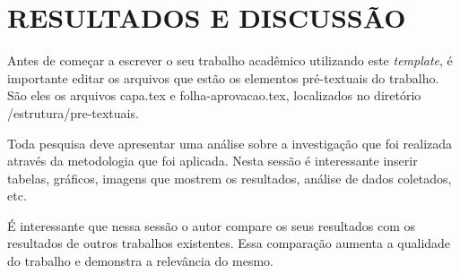 
\chapter{RESULTADOS E DISCUSSÃO}
\label{chap:resultadosDiscussao}

Antes de começar a escrever o seu trabalho acadêmico utilizando este \emph{template}, é importante editar os arquivos que estão os elementos pré-textuais do trabalho.
São eles os arquivos {\ttfamily capa.tex} e {\ttfamily folha-aprovacao.tex}, localizados no diretório  {\ttfamily /estrutura/pre-textuais}.

Toda pesquisa deve apresentar uma análise sobre a investigação que foi realizada através da metodologia que foi aplicada. Nesta sessão é interessante inserir tabelas, gráficos, imagens que mostrem os resultados, análise de dados coletados, etc.

É interessante que nessa sessão o autor compare os seus resultados com os resultados de outros trabalhos existentes. Essa comparação aumenta a qualidade do trabalho e demonstra a relevância do mesmo. 